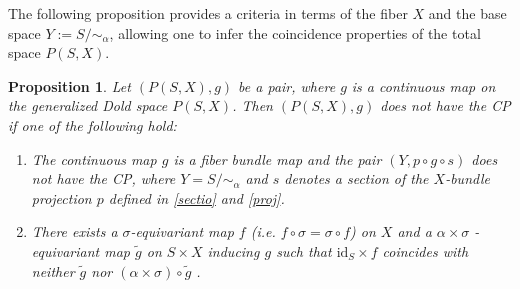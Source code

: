 \documentclass{amsart}
\newtheorem{proposition}[theorem]{Proposition}
\newcommand{\subsecref}[1]{Subsection~\ref{#1}}
\begin{document}
	
	 The following proposition provides a criteria in terms of the fiber $X$ and the base space $Y := S/\!\!\sim_\alpha$, allowing one to infer the coincidence properties of the total space $P(S,X)$.
	
	
	
	\begin{proposition}\label{necessary condition}
		Let $(P(S,X),g)$ be a pair, where $g$ is a continuous map on the generalized Dold space $P(S,X)$. Then $(P(S,X),g)$ does not have the CP %
if one of %
the following %
hold:
		\begin{enumerate}
			\item The %
continuous map $g$ is a fiber bundle map and the pair $(Y,p \circ g \circ s)$ does not have the CP, 
			where $Y = S/\!\!\sim_\alpha$ and $s$ denotes a section of the $X$-bundle projection $p$ defined in \eqref{sectio} %
and \eqref{proj}.
			
			\item  
			There %
exists a $\sigma$-equivariant map $f$ (i.e. $f\circ\sigma =\sigma\circ f$) on $X$ %
and a $\alpha \times \sigma$%
-equivariant map $\tilde g$ on $S\times X$ inducing $g$ such that
			$\mathrm{id}_S \times f$ coincides with neither $\tilde{g}$ nor
			$(\alpha \times \sigma) \circ \tilde{g}$%
.
		\end{enumerate}
		
		
		
	\end{proposition}
\end{document}
